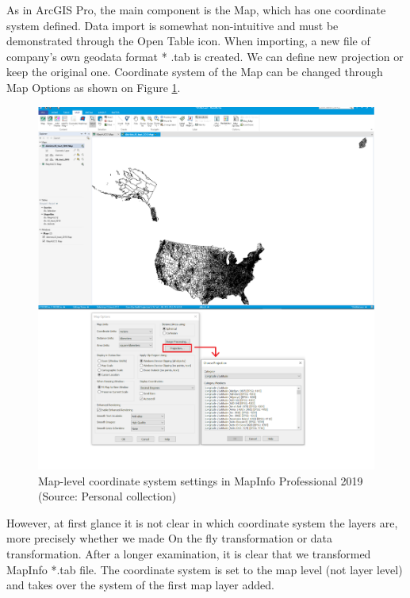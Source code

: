 \documentclass[a4paper,10pt,twoside]{article}
\begin{document}
\noindent As in ArcGIS Pro, the main component is the Map, which has one coordinate system defined. Data import is somewhat non-intuitive and must be demonstrated through the Open Table icon. When importing, a new file of company's own geodata format * .tab is created. We can define new projection or keep the original one. Coordinate system of the Map can be changed through Map Options as shown on Figure \ref{fig:map_info_startup_projection}. 

\vspace{0.3cm}
\begin{figure}[hbt!] 
\begin{center}
\includegraphics[width=16cm]{../pictures/map_info.PNG} 
\caption[Map-level coordinate system settings in MapInfo Professional 2019]{Map-level coordinate system settings in MapInfo Professional 2019 (Source: Personal collection)}
\label{fig:map_info_startup_projection}
\end{center}
\end{figure}

\noindent However, at first glance it is not clear in which coordinate system the layers are, more precisely whether we made On the fly transformation or data transformation. After a longer examination, it is clear that we transformed MapInfo *.tab file. The coordinate system is set to the map level (not layer level) and takes over the system of the first map layer added. 
\end{document}
